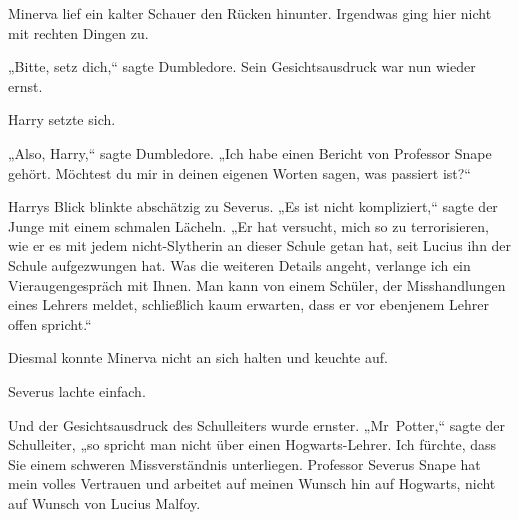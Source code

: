 Minerva lief ein kalter Schauer den Rücken hinunter. Irgendwas ging hier nicht mit rechten Dingen zu.

„Bitte, setz dich,“ sagte Dumbledore. Sein Gesichtsausdruck war nun wieder ernst.

Harry setzte sich.

„Also, Harry,“ sagte Dumbledore. „Ich habe einen Bericht von Professor Snape gehört. Möchtest du mir in deinen eigenen Worten sagen, was passiert ist?“

Harrys Blick blinkte abschätzig zu Severus. „Es ist nicht kompliziert,“ sagte der Junge mit einem schmalen Lächeln. „Er hat versucht, mich so zu terrorisieren, wie er es mit jedem nicht-Slytherin an dieser Schule getan hat, seit Lucius ihn der Schule aufgezwungen hat. Was die weiteren Details angeht, verlange ich ein Vieraugengespräch mit Ihnen. Man kann von einem Schüler, der Misshandlungen eines Lehrers meldet, schließlich kaum erwarten, dass er vor ebenjenem Lehrer offen spricht.“

Diesmal konnte Minerva nicht an sich halten und keuchte auf.

Severus lachte einfach.

Und der Gesichtsausdruck des Schulleiters wurde ernster. „Mr~Potter,“ sagte der Schulleiter, „so spricht man nicht über einen Hogwarts-Lehrer. Ich fürchte, dass Sie einem schweren Missverständnis unterliegen. Professor Severus Snape hat mein volles Vertrauen und arbeitet auf meinen Wunsch hin auf Hogwarts, nicht auf Wunsch von Lucius Malfoy.

